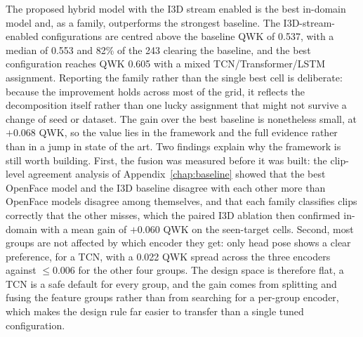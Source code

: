 \documentclass[../main.tex]{subfiles}
\begin{document}
The proposed hybrid model with the I3D stream enabled is the best in-domain model and, as a family, outperforms the strongest baseline. The I3D-stream-enabled configurations are centred above the baseline QWK of 0.537, with a median of 0.553 and 82\% of the 243 clearing the baseline, and the best configuration reaches QWK 0.605 with a mixed TCN/Transformer/LSTM assignment. Reporting the family rather than the single best cell is deliberate: because the improvement holds across most of the grid, it reflects the decomposition itself rather than one lucky assignment that might not survive a change of seed or dataset. The gain over the best baseline is nonetheless small, at $+0.068$ QWK, so the value lies in the framework and the full evidence rather than in a jump in state of the art. Two findings explain why the framework is still worth building. First, the fusion was measured before it was built: the clip-level agreement analysis of Appendix~\ref{chap:baseline} showed that the best OpenFace model and the I3D baseline disagree with each other more than OpenFace models disagree among themselves, and that each family classifies clips correctly that the other misses, which the paired I3D ablation then confirmed in-domain with a mean gain of $+0.060$ QWK on the seen-target cells. Second, most groups are not affected by which encoder they get: only head pose shows a clear preference, for a TCN, with a 0.022 QWK spread across the three encoders against $\le0.006$ for the other four groups. The design space is therefore flat, a TCN is a safe default for every group, and the gain comes from splitting and fusing the feature groups rather than from searching for a per-group encoder, which makes the design rule far easier to transfer than a single tuned configuration.
\end{document}
